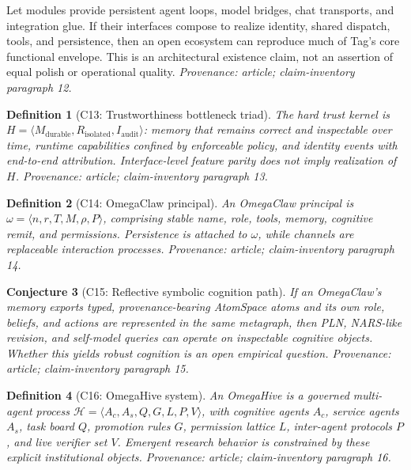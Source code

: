 \documentclass[11pt,a4paper]{article}
\newtheorem{definition}{Definition}[section]
\newtheorem{conjecture}[definition]{Conjecture}
\begin{document}
\begin{claim}
Let modules provide persistent agent loops, model bridges, chat transports,
and integration glue.  If their interfaces compose to realize identity,
shared dispatch, tools, and persistence, then an open ecosystem can reproduce
much of Tag's core functional envelope.  This is an architectural existence
claim, not an assertion of equal polish or operational quality.
\emph{Provenance: article; claim-inventory paragraph 12.}
\end{claim}

\begin{definition}[C13: Trustworthiness bottleneck triad]
The hard trust kernel is
$H=\langle M_{\mathrm{durable}},R_{\mathrm{isolated}},I_{\mathrm{audit}}\rangle$:
memory that remains correct and inspectable over time, runtime capabilities
confined by enforceable policy, and identity events with end-to-end
attribution.  Interface-level feature parity does not imply realization of
$H$.  \emph{Provenance: article; claim-inventory paragraph 13.}
\end{definition}

\begin{definition}[C14: OmegaClaw principal]
An OmegaClaw principal is
$\omega=\langle n,r,T,M,\rho,P\rangle$, comprising stable name, role, tools,
memory, cognitive remit, and permissions.  Persistence is attached to
$\omega$, while channels are replaceable interaction processes.
\emph{Provenance: article; claim-inventory paragraph 14.}
\end{definition}

\begin{conjecture}[C15: Reflective symbolic cognition path]
If an OmegaClaw's memory exports typed, provenance-bearing AtomSpace atoms and
its own role, beliefs, and actions are represented in the same metagraph,
then PLN, NARS-like revision, and self-model queries can operate on inspectable
cognitive objects.  Whether this yields robust cognition is an open empirical
question.  \emph{Provenance: article; claim-inventory paragraph 15.}
\end{conjecture}

\begin{definition}[C16: OmegaHive system]
An OmegaHive is a governed multi-agent process
$\mathcal{H}=\langle A_c,A_s,Q,G,L,P,V\rangle$, with cognitive agents $A_c$,
service agents $A_s$, task board $Q$, promotion rules $G$, permission lattice
$L$, inter-agent protocols $P$, and live verifier set $V$.  Emergent research
behavior is constrained by these explicit institutional objects.
\emph{Provenance: article; claim-inventory paragraph 16.}
\end{definition}
\end{document}
